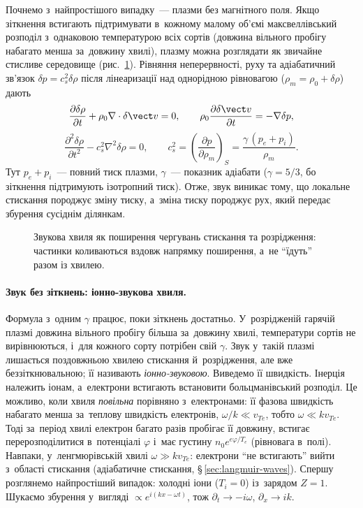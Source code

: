 Почнемо з~найпростішого випадку~--- плазми без магнітного поля. Якщо зіткнення
встигають підтримувати в~кожному малому об'ємі максвеллівський розподіл з~однаковою температурою
всіх сортів (довжина вільного пробігу набагато менша за~довжину хвилі), плазму можна розглядати
як звичайне стисливе середовище (рис.~\ref{fig:plasma-sound-wave}). Рівняння неперервності, руху та адіабатичний зв'язок $\delta p=c_s^2\delta\rho$
після лінеаризації над однорідною рівновагою ($\rho_m=\rho_0+\delta\rho$) дають
\begin{equation}
\frac{\partial\delta\rho}{\partial t}+\rho_0\nabla\cdot\delta\vect v=0,
\qquad
\rho_0\frac{\partial\delta\vect v}{\partial t}=-\nabla\delta p,
\label{eq:wave-linear-continuity}
\end{equation}
\begin{equation}
\frac{\partial^2\delta\rho}{\partial t^2}-c_s^2\nabla^2\delta\rho=0,
\qquad
c_s^2=\left(\frac{\partial p}{\partial\rho_m}\right)_S=\frac{\gamma\,(p_e+p_i)}{\rho_m}.
\label{eq:wave-sound-equation}
\end{equation}
Тут $p_e+p_i$~--- повний тиск плазми, $\gamma$~--- показник адіабати ($\gamma=5/3$, бо зіткнення
підтримують ізотропний тиск). Отже, звук виникає тому, що
локальне стискання породжує зміну тиску, а~зміна тиску породжує рух, який передає
збурення сусіднім ділянкам.

\begin{figure}[ht]
\centering
{}
\caption{Звукова хвиля як поширення чергувань стискання та розрідження: частинки
коливаються вздовж напрямку поширення, а~не \enquote{їдуть} разом із хвилею.}
\label{fig:plasma-sound-wave}
\end{figure}

\paragraph{Звук без зіткнень: іонно-звукова хвиля.}
Формула з~одним $\gamma$ працює, поки зіткнень достатньо. У~розрідженій гарячій плазмі
довжина вільного пробігу більша за~довжину хвилі, температури сортів не вирівнюються, і~для
кожного сорту потрібен свій $\gamma$. Звук у~такій плазмі лишається поздовжньою хвилею стискання й~розрідження, але вже беззіткнювальною; її називають \emph{іонно-звуковою}.
Виведемо її швидкість. Інерція належить іонам, а~електрони встигають встановити больцманівський розподіл.
Це можливо, коли хвиля \emph{повільна} порівняно з~електронами: її фазова швидкість набагато менша
за~теплову швидкість електронів, $\omega/k\ll v_{Te}$, тобто $\omega\ll kv_{Te}$. Тоді за~період хвилі
електрон багато разів пробігає її довжину, встигає перерозподілитися в~потенціалі $\varphi$
і~має густину $n_0e^{e\varphi/T_e}$ (рівновага в~полі). Навпаки, у~ленгмюрівській хвилі $\omega\gg kv_{Te}$:
електрони \enquote{не встигають} вийти з~області стискання (адіабатичне стискання, §\,\ref{sec:langmuir-waves}).
Спершу розглянемо найпростіший випадок: холодні іони ($T_i=0$) із~зарядом $Z=1$. Шукаємо збурення
у~вигляді $\propto e^{i(kx-\omega t)}$, тож $\partial_t\to-i\omega$, $\partial_x\to ik$.

